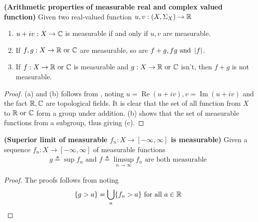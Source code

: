 \documentclass{report}
\begin{document}
\begin{theorem}
\label{Btsa}
\textbf{(Arithmetic properties of measurable real and complex valued function)} Given two real-valued function $u,v:(X,\Sigma_X)\rightarrow \mathbb{R}$
\begin{enumerate}[label=(\alph*)]
  \item  $u+iv:X\rightarrow \mathbb{C}$ is measurable if and only if $u,v$ are measurable.
  \item If  $f,g:X\rightarrow \mathbb{R}\text{ or }\mathbb{C}$ are measurable, so are $f+g,fg\text{ and }\left|f\right|$.
  \item If $f:X\rightarrow \mathbb{R}\text{ or }\mathbb{C}$ is measurable and $g:X\rightarrow \mathbb{R}\text{ or }\mathbb{C}$ isn't, then $f+g$ is not measurable.
\end{enumerate}
\end{theorem}
\begin{proof}
(a) and (b) follows from , noting $u=\operatorname{Re}(u+iv),v=\operatorname{Im}(u+iv)$ and the fact $\mathbb{R},\mathbb{C}$ are topological fields. It is clear that the set of all function from  $X$ to $\mathbb{R}\text{ or }\mathbb{C}$ form a group under addition. (b) shows that the set of measurable functions from a subgroup, thus giving (c).
\end{proof}
\begin{theorem}
\label{Slm}
\textbf{(Superior limit of measurable $f_n:X\rightarrow [-\infty,\infty]$ is measurable)} Given a sequence $f_n:X\rightarrow [-\infty, \infty]$ of measurable functions
\begin{align*}
g\triangleq \sup f_n \text{ and }f\triangleq \limsup_{n\to\infty} f_n\text{ are both measurable }
\end{align*}
\end{theorem}
\begin{proof}
The proofs follows from noting 
\begin{align*}
\{ g>a \}=\bigcup_n \{ f_n>a \}\text{ for all $a\in\mathbb{R}$ }
\end{align*}
\end{proof}
\end{document}
